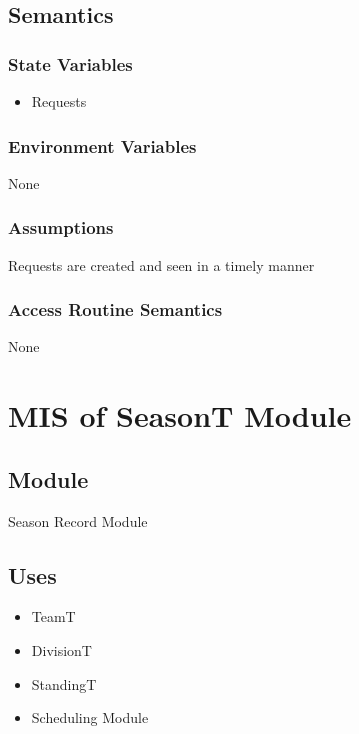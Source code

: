 \documentclass[12pt, titlepage]{article}
\begin{document}
\subsection{Semantics}

\subsubsection{State Variables}
\begin{itemize}
  \item Requests
\end{itemize}

\subsubsection{Environment Variables}

None

\subsubsection{Assumptions}

Requests are created and seen in a timely manner

\subsubsection{Access Routine Semantics}

None

\newpage

\section{MIS of SeasonT Module} \label{SeasonT}

\subsection{Module}

Season Record Module

\subsection{Uses}
\begin{itemize}
  \item TeamT
  \item DivisionT
  \item StandingT
  \item Scheduling Module
\end{itemize}
\end{document}
